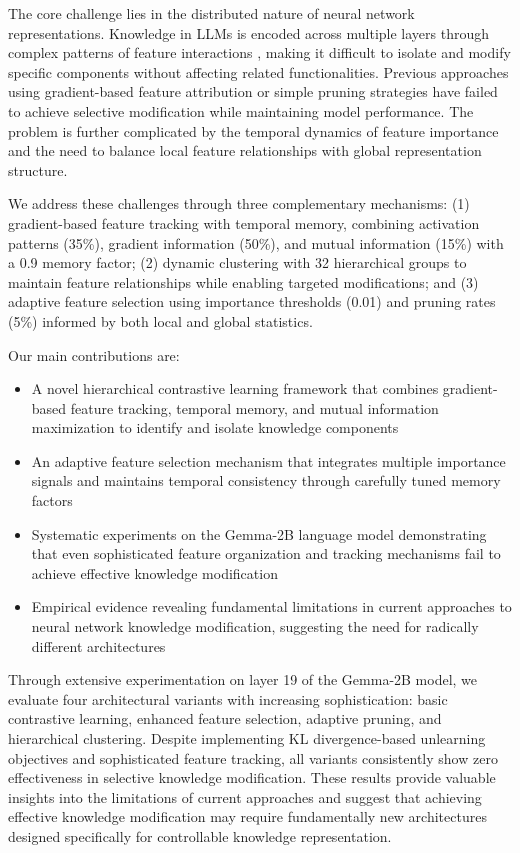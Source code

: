 \documentclass{article} %
\begin{document}
The core challenge lies in the distributed nature of neural network representations. Knowledge in LLMs is encoded across multiple layers through complex patterns of feature interactions \cite{vaswani2017attention}, making it difficult to isolate and modify specific components without affecting related functionalities. Previous approaches using gradient-based feature attribution or simple pruning strategies have failed to achieve selective modification while maintaining model performance. The problem is further complicated by the temporal dynamics of feature importance and the need to balance local feature relationships with global representation structure.

We address these challenges through three complementary mechanisms: (1) gradient-based feature tracking with temporal memory, combining activation patterns (35\%), gradient information (50\%), and mutual information (15\%) with a 0.9 memory factor; (2) dynamic clustering with 32 hierarchical groups to maintain feature relationships while enabling targeted modifications; and (3) adaptive feature selection using importance thresholds (0.01) and pruning rates (5\%) informed by both local and global statistics.

Our main contributions are:
\begin{itemize}
    \item A novel hierarchical contrastive learning framework that combines gradient-based feature tracking, temporal memory, and mutual information maximization to identify and isolate knowledge components
    \item An adaptive feature selection mechanism that integrates multiple importance signals and maintains temporal consistency through carefully tuned memory factors
    \item Systematic experiments on the Gemma-2B language model demonstrating that even sophisticated feature organization and tracking mechanisms fail to achieve effective knowledge modification
    \item Empirical evidence revealing fundamental limitations in current approaches to neural network knowledge modification, suggesting the need for radically different architectures
\end{itemize}

Through extensive experimentation on layer 19 of the Gemma-2B model, we evaluate four architectural variants with increasing sophistication: basic contrastive learning, enhanced feature selection, adaptive pruning, and hierarchical clustering. Despite implementing KL divergence-based unlearning objectives and sophisticated feature tracking, all variants consistently show zero effectiveness in selective knowledge modification. These results provide valuable insights into the limitations of current approaches and suggest that achieving effective knowledge modification may require fundamentally new architectures designed specifically for controllable knowledge representation.
\end{document}
